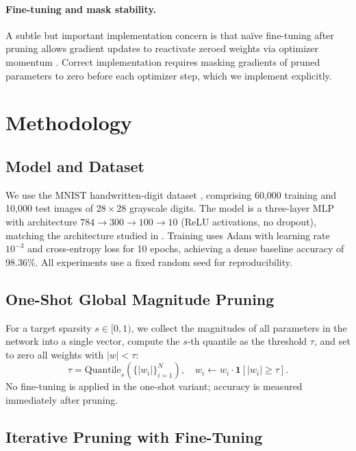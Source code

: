 \documentclass{article}
\begin{document}
\paragraph{Fine-tuning and mask stability.}
A subtle but important implementation concern is that naïve fine-tuning after pruning
allows gradient updates to reactivate zeroed weights via optimizer momentum \citep{guo2016dynamic}.
Correct implementation requires masking gradients of pruned parameters to zero before
each optimizer step, which we implement explicitly.

\section{Methodology}

\subsection{Model and Dataset}

We use the MNIST handwritten-digit dataset \citep{lecun1998gradient}, comprising
60{,}000 training and 10{,}000 test images of $28{\times}28$ grayscale digits.
The model is a three-layer MLP with architecture $784 \to 300 \to 100 \to 10$
(ReLU activations, no dropout), matching the architecture studied in \citet{han2015learning}.
Training uses Adam \citep{kingma2015adam} with learning rate $10^{-3}$ and cross-entropy loss
for 10 epochs, achieving a dense baseline accuracy of 98.36\%.
All experiments use a fixed random seed for reproducibility.

\subsection{One-Shot Global Magnitude Pruning}

For a target sparsity $s \in [0, 1)$, we collect the magnitudes of all parameters in
the network into a single vector, compute the $s$-th quantile as the threshold $\tau$,
and set to zero all weights with $|w| < \tau$:
\begin{equation}
  \tau = \text{Quantile}_{s}\!\left(\{|w_i|\}_{i=1}^{N}\right), \quad
  w_i \leftarrow w_i \cdot \mathbf{1}[|w_i| \geq \tau].
\end{equation}
No fine-tuning is applied in the one-shot variant; accuracy is measured immediately
after pruning.

\subsection{Iterative Pruning with Fine-Tuning}
\end{document}
